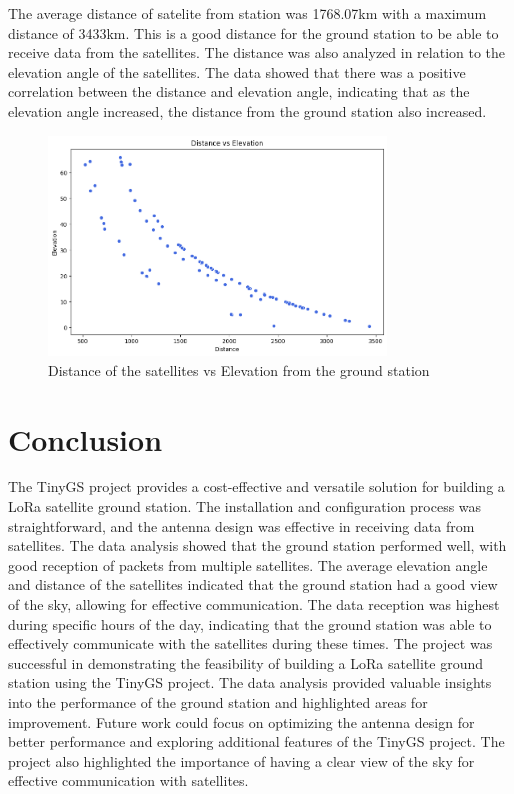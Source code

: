 \documentclass[12pt,a4paper]{article}
\begin{document}
The average distance of satelite from station was 1768.07km with a maximum distance of 3433km. This is a good distance for the ground station to be able to receive data from the satellites. The distance was also analyzed in relation to the elevation angle of the satellites. The data showed that there was a positive correlation between the distance and elevation angle, indicating that as the elevation angle increased, the distance from the ground station also increased.

\begin{figure}[H]
    \centering
    \includegraphics[width=0.8\textwidth]{../images/corr.png}
    \caption{Distance of the satellites vs Elevation from the ground station}
    \label{fig:distance_data}
\end{figure}

\section{Conclusion}
The TinyGS project provides a cost-effective and versatile solution for building a LoRa satellite ground station. The installation and configuration process was straightforward, and the antenna design was effective in receiving data from satellites. The data analysis showed that the ground station performed well, with good reception of packets from multiple satellites.
The average elevation angle and distance of the satellites indicated that the ground station had a good view of the sky, allowing for effective communication. The data reception was highest during specific hours of the day, indicating that the ground station was able to effectively communicate with the satellites during these times.
The project was successful in demonstrating the feasibility of building a LoRa satellite ground station using the TinyGS project. The data analysis provided valuable insights into the performance of the ground station and highlighted areas for improvement.
Future work could focus on optimizing the antenna design for better performance and exploring additional features of the TinyGS project. The project also highlighted the importance of having a clear view of the sky for effective communication with satellites.
\end{document}
